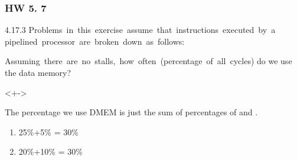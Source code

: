 \documentclass[xcolor=table]{beamer}
\begin{document}
\begin{mdframe}%

\frametitle{HW 5. 7}\label{heading-sec-hw-5-7}%

\noindent{}4.17.3 Problems  in  this  exercise  assume  that  instructions  executed  by  a  pipelined  processor  are  broken  down  as  follows:%

\begin{mdcenter}%
\end{mdcenter}%

\noindent{}Assuming  there  are  no  stalls,  how  often  (percentage  of  all  cycles) do we use the data memory?%

\mdhr{}%

\begin{onlyenv}<+->%

\noindent{}The percentage we use DMEM is just the sum of percentages of  and .%

\begin{enumerate}[noitemsep,topsep=\mdcompacttopsep,label=\alph*.]%

\item{}25\%+5\%  = 30\%%

\item{}20\%+10\% = 30\%%
\end{enumerate}%
\end{onlyenv}%
\end{mdframe}\label{sec-hw-5-7}%
\end{document}
